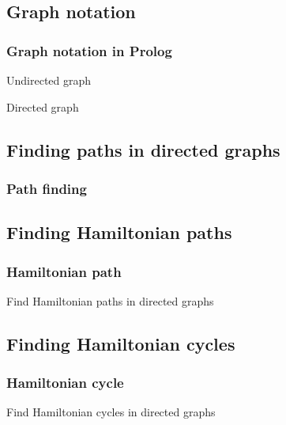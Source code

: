 \documentclass{beamer}
\begin{document}
	\subsection{Graph notation}
	\begin{frame}
		\frametitle{Graph notation in Prolog}
		
		\begin{block}{Undirected graph}
		\end{block}
		\begin{block}{Directed graph}
		\end{block}
	\end{frame}
	
	\subsection{Finding paths in directed graphs}
	\begin{frame}
		\frametitle{Path finding}
		
	\end{frame}
	
	\subsection{Finding Hamiltonian paths}
	\begin{frame}
		\frametitle{Hamiltonian path}
		\begin{block}{Find Hamiltonian paths in directed graphs}
		\end{block}
	\end{frame}
	
	\subsection{Finding Hamiltonian cycles}
	\begin{frame}
		\frametitle{Hamiltonian cycle}
		\begin{block}{Find Hamiltonian cycles in directed graphs}
		\end{block}
	\end{frame}
	
\end{document}
